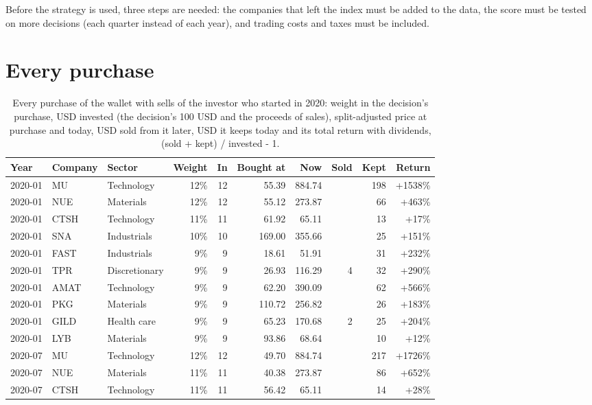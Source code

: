 \documentclass[11pt,a4paper]{article}
\begin{document}
Before the strategy is used, three steps are needed: the companies that left the index must be added to the data, the score must be tested on more decisions (each quarter instead of each year), and trading costs and taxes must be included.

\newpage
\appendix
\section{Every purchase}
\label{app:purchases}
{\small
\begin{longtable}{l l l r r r r r r r}
\caption{Every purchase of the wallet with sells of the investor who started in 2020: weight in the decision's purchase, USD invested (the decision's 100 USD and the proceeds of sales), split-adjusted price at purchase and today, USD sold from it later, USD it keeps today and its total return with dividends, (sold + kept) / invested - 1.}\label{tab:purchases}\\
\hline
Year & Company & Sector & Weight & In & Bought at & Now & Sold & Kept & Return \\
\hline
\endhead
2020-01 & MU & Technology & 12\% & 12 & 55.39 & 884.74 &  & 198 & +1538\% \\
2020-01 & NUE & Materials & 12\% & 12 & 55.12 & 273.87 &  & 66 & +463\% \\
2020-01 & CTSH & Technology & 11\% & 11 & 61.92 & 65.11 &  & 13 & +17\% \\
2020-01 & SNA & Industrials & 10\% & 10 & 169.00 & 355.66 &  & 25 & +151\% \\
2020-01 & FAST & Industrials & 9\% & 9 & 18.61 & 51.91 &  & 31 & +232\% \\
2020-01 & TPR & Discretionary & 9\% & 9 & 26.93 & 116.29 & 4 & 32 & +290\% \\
2020-01 & AMAT & Technology & 9\% & 9 & 62.20 & 390.09 &  & 62 & +566\% \\
2020-01 & PKG & Materials & 9\% & 9 & 110.72 & 256.82 &  & 26 & +183\% \\
2020-01 & GILD & Health care & 9\% & 9 & 65.23 & 170.68 & 2 & 25 & +204\% \\
2020-01 & LYB & Materials & 9\% & 9 & 93.86 & 68.64 &  & 10 & +12\% \\
2020-07 & MU & Technology & 12\% & 12 & 49.70 & 884.74 &  & 217 & +1726\% \\
2020-07 & NUE & Materials & 11\% & 11 & 40.38 & 273.87 &  & 86 & +652\% \\
2020-07 & CTSH & Technology & 11\% & 11 & 56.42 & 65.11 &  & 14 & +28\% \\

\end{longtable}}
\end{document}
